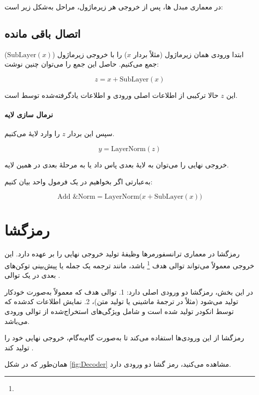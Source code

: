 در معماری مبدل ها، پس از خروجی هر زیرماژول، مراحل به‌شکل زیر است:

\subsection{اتصال باقی مانده}
ابتدا ورودی همان زیرماژول (مثلاً بردار \( x \)) را با خروجی زیرماژول (\( \text{SubLayer}(x) \)) جمع می‌کنیم. حاصل این جمع را می‌توان چنین نوشت:


\begin{equation}
	z = x + \text{SubLayer}(x)
\end{equation}


این \( z \) حالا ترکیبی از اطلاعات اصلی ورودی و اطلاعات یادگرفته‌شده توسط  است.

\paragraph{نرمال سازی لایه}
سپس این بردار \( z \) را وارد لایهٔ  می‌کنیم.

\[
y = \text{LayerNorm}(z)
\]

خروجی نهایی را می‌توان به لایهٔ بعدی پاس داد یا به مرحلهٔ بعدی در همین لایه.

به‌عبارتی اگر بخواهیم در یک فرمول واحد بیان کنیم:

\[
\text{Add \& Norm} = \text{LayerNorm}\bigl(x + \text{SubLayer}(x)\bigr)
\]


\section{رمزگشا}
رمزگشا در معماری ترانسفورمرها وظیفهٔ تولید خروجی نهایی را بر عهده دارد. این خروجی معمولاً می‌تواند توالی هدف \footnote{} باشد، مانند ترجمه یک جمله یا پیش‌بینی توکن‌های بعدی در یک توالی \cite{vaswani2017attention}. 

در این بخش، رمزگشا دو ورودی اصلی دارد:  
1. توالی هدف که معمولاً به‌صورت خودکار تولید می‌شود (مثلاً در ترجمهٔ ماشینی یا تولید متن)،  
2. نمایش اطلاعات کدشده که توسط انکودر تولید شده است و شامل ویژگی‌های استخراج‌شده از توالی ورودی می‌باشد.  

رمزگشا از این ورودی‌ها استفاده می‌کند تا به‌صورت گام‌به‌گام، خروجی نهایی خود را تولید کند \cite{bahdanau2014neural,sutskever2014sequence}.

همان‌طور که در شکل \ref{fig:Decoder} مشاهده می‌کنید،  رمز گشا دو ورودی دارد.

